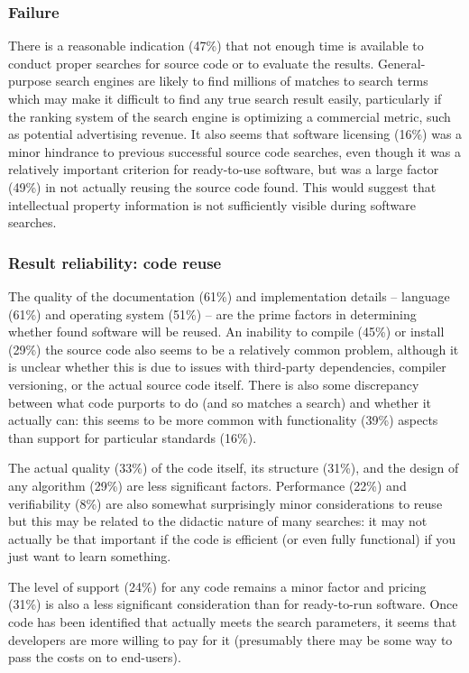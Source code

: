 \documentclass{casicswhitepaper}
\begin{document}
\subsubsection{Failure}

There is a reasonable indication (47\%) that not enough time is available to conduct proper searches for source code or to evaluate the results. General-purpose search engines are likely to find millions of matches to search terms which may make it difficult to find any true search result easily, particularly if the ranking system of the search engine is optimizing a commercial metric, such as potential advertising revenue. It also seems that software licensing (16\%) was a minor hindrance to previous successful source code searches, even though it was a relatively important criterion for ready-to-use software, but was a large factor (49\%) in not actually reusing the source code found. This would suggest that intellectual property information is not sufficiently visible during software searches.

\subsubsection{Result reliability: code reuse}

The quality of the documentation (61\%) and implementation details -- language (61\%) and operating system (51\%) -- are the prime factors in determining whether found software will be reused. An inability to compile (45\%) or install (29\%) the source code also seems to be a relatively common problem, although it is unclear whether this is due to issues with third-party dependencies, compiler versioning, or the actual source code itself. There is also some discrepancy between what code purports to do (and so matches a search) and whether it actually can: this seems to be more common with functionality (39\%) aspects than support for particular standards (16\%). 

The actual quality (33\%) of the code itself, its structure (31\%), and the design of any algorithm (29\%) are less significant factors. Performance (22\%) and verifiability (8\%) are also somewhat surprisingly minor considerations to reuse but this may be related to the didactic nature of many searches: it may not actually be that important if the code is efficient (or even fully functional) if you just want to learn something.

The level of support (24\%) for any code remains a minor factor and pricing (31\%) is also a less significant consideration than for ready-to-run software. Once code has been identified that actually meets the search parameters, it seems that developers are more willing to pay for it (presumably there may be some way to pass the costs on to end-users).
\end{document}
